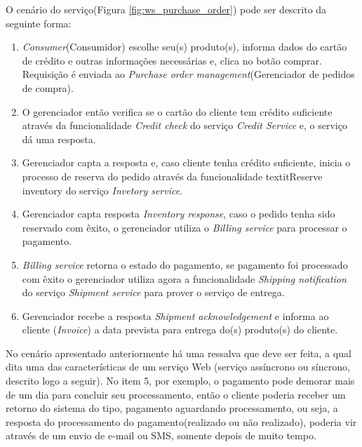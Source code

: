 O cenário do serviço(Figura \ref{fig:ws_purchase_order}) pode ser descrito da seguinte forma:
\begin{enumerate}
\item \textit{Consumer}(Consumidor) escolhe seu(s) produto(s), informa dados do cartão de crédito e outras informações necessárias e, clica no botão comprar. Requisição é enviada ao \textit{Purchase order management}(Gerenciador de pedidos de compra).
\item O gerenciador então verifica se o cartão do cliente tem crédito suficiente através da funcionalidade \textit{Credit check} do serviço \textit{Credit Service} e, o serviço dá uma resposta.
\item Gerenciador capta a resposta e, caso cliente tenha crédito suficiente, inicia o processo de reserva do pedido através da funcionalidade textit{Reserve inventory} do serviço \textit{Invetory service}.
\item Gerenciador capta resposta \textit{Inventory response}, caso o pedido tenha sido reservado com êxito, o gerenciador utiliza o \textit{Billing service} para processar o pagamento.
\item \textit{Billing service} retorna o estado do pagamento, se pagamento foi processado com êxito o gerenciador utiliza agora a funcionalidade \textit{Shipping notification} do serviço \textit{Shipment service} para prover o serviço de entrega.
\item Gerenciador recebe a resposta \textit{Shipment acknowledgement} e informa ao cliente (\textit{Invoice}) a data prevista para entrega do(s) produto(s) do cliente.
\end{enumerate}

No cenário apresentado anteriormente há uma ressalva que deve ser feita, a qual dita uma das características de um serviço Web (serviço assíncrono ou síncrono, descrito logo a seguir). No item 5, por exemplo, o pagamento pode demorar mais de um dia para concluir seu processamento, então o cliente poderia receber um retorno do sistema do tipo, pagamento aguardando processamento, ou seja, a resposta do processamento do pagamento(realizado ou não realizado), poderia vir através de um envio de e-mail ou SMS, somente depois de muito tempo.

